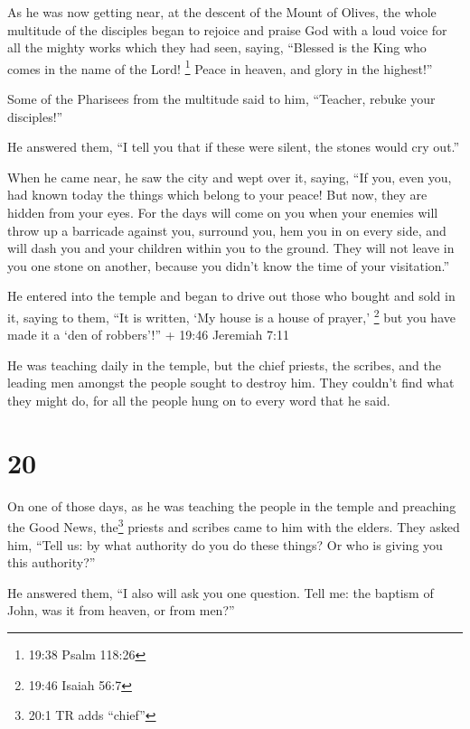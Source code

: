  As he was now getting near, at the descent of the Mount of
Olives, the whole multitude of the disciples began to rejoice and praise
God with a loud voice for all the mighty works which they had seen,
 saying, ``Blessed is the King who comes in the name of the
Lord! \footnote{19:38 Psalm 118:26} Peace in heaven, and glory in the
highest!''

 Some of the Pharisees from the multitude said to him,
``Teacher, rebuke your disciples!''

 He answered them, ``I tell you that if these were silent,
the stones would cry out.''

 When he came near, he saw the city and wept over it,
 saying, ``If you, even you, had known today the things
which belong to your peace! But now, they are hidden from your eyes.
 For the days will come on you when your enemies will throw
up a barricade against you, surround you, hem you in on every side,
 and will dash you and your children within you to the
ground. They will not leave in you one stone on another, because you
didn't know the time of your visitation.''

 He entered into the temple and began to drive out those
who bought and sold in it,  saying to them, ``It is
written, `My house is a house of prayer,' \footnote{19:46 Isaiah 56:7}
but you have made it a `den of robbers'!'' + 19:46 Jeremiah 7:11

 He was teaching daily in the temple, but the chief
priests, the scribes, and the leading men amongst the people sought to
destroy him.  They couldn't find what they might do, for
all the people hung on to every word that he said.

\hypertarget{section-19}{%
\section{20}\label{section-19}}

 On one of those days, as he was teaching the people in the
temple and preaching the Good News, the\footnote{20:1 TR adds ``chief''}
priests and scribes came to him with the elders.  They asked
him, ``Tell us: by what authority do you do these things? Or who is
giving you this authority?''

 He answered them, ``I also will ask you one question. Tell
me:  the baptism of John, was it from heaven, or from men?''

